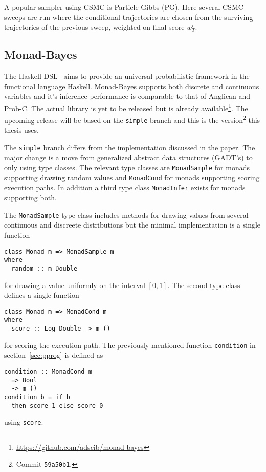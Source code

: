 A popular sampler using CSMC is Particle Gibbs (PG). Here several CSMC sweeps are run where the conditional trajectories are chosen from the surviving trajectories of the previous sweep, weighted on final score $w_T^i$.

\subsection{Monad-Bayes}
\label{sec:mbayes}

The Haskell DSL~\cite{mbayes} aims to provide an universal probabilistic
framework in the functional language Haskell. Monad-Bayes supports both
discrete and continuous variables and it's inference performance is comparable to that of
Anglican and Prob-C. The actual library is yet to be released but is already
available\footnote{\url{https://github.com/adscib/monad-bayes}}. The upcoming release
will be based on the \texttt{simple} branch and this is the
version\footnote{Commit \texttt{59a50b1}.} this thesis uses.

The \texttt{simple} branch differs from the implementation discussed in the
paper. The major change is a move from generalized abstract data structures
(GADT's) to only using type classes. The relevant type classes are
\texttt{MonadSample} for monads supporting drawing random values and
\texttt{MonadCond} for monads supporting scoring execution paths. In addition a third type class
\texttt{MonadInfer} exists for monads supporting both.

The \texttt{MonadSample} type class includes methods for drawing values from
several continuous and discreete distributions but the minimal implementation is
a single function
\begin{verbatim}
class Monad m => MonadSample m
where
  random :: m Double
  \end{verbatim}
for drawing a value uniformly on the interval $[0,1]$. The second type class
defines a single function
\begin{verbatim}
class Monad m => MonadCond m
where
  score :: Log Double -> m ()
  \end{verbatim}
for scoring the execution path. The previously mentioned function
\texttt{condition} in section~\ref{sec:pprog} is defined as
\begin{verbatim}
condition :: MonadCond m
  => Bool
  -> m ()
condition b = if b
  then score 1 else score 0
\end{verbatim}
using \texttt{score}. 

